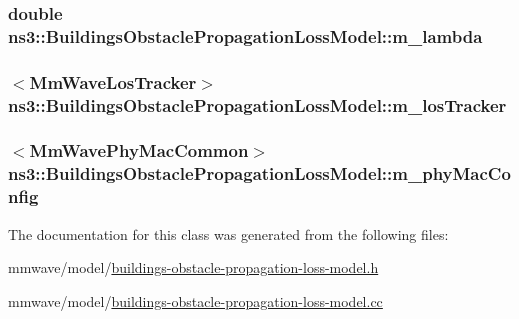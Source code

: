 \subsubsection[{\texorpdfstring{m\+\_\+lambda}{m_lambda}}]{\setlength{\rightskip}{0pt plus 5cm}double ns3\+::\+Buildings\+Obstacle\+Propagation\+Loss\+Model\+::m\+\_\+lambda\hspace{0.3cm}{\ttfamily [private]}}\hypertarget{classns3_1_1BuildingsObstaclePropagationLossModel_a9458e5626cd41b80c52ea62e3f3c8b2d}{}\label{classns3_1_1BuildingsObstaclePropagationLossModel_a9458e5626cd41b80c52ea62e3f3c8b2d}
\subsubsection[{\texorpdfstring{m\+\_\+los\+Tracker}{m_losTracker}}]{$<${\bf Mm\+Wave\+Los\+Tracker}$>$ ns3\+::\+Buildings\+Obstacle\+Propagation\+Loss\+Model\+::m\+\_\+los\+Tracker\hspace{0.3cm}{\ttfamily [private]}}\hypertarget{classns3_1_1BuildingsObstaclePropagationLossModel_a83f238f872f055847c5b938a3ac1ceaf}{}\label{classns3_1_1BuildingsObstaclePropagationLossModel_a83f238f872f055847c5b938a3ac1ceaf}
\subsubsection[{\texorpdfstring{m\+\_\+phy\+Mac\+Config}{m_phyMacConfig}}]{$<${\bf Mm\+Wave\+Phy\+Mac\+Common}$>$ ns3\+::\+Buildings\+Obstacle\+Propagation\+Loss\+Model\+::m\+\_\+phy\+Mac\+Config\hspace{0.3cm}{\ttfamily [private]}}\hypertarget{classns3_1_1BuildingsObstaclePropagationLossModel_a381a30a4251756853831782b3e58c721}{}\label{classns3_1_1BuildingsObstaclePropagationLossModel_a381a30a4251756853831782b3e58c721}


The documentation for this class was generated from the following files\+:\begin{DoxyCompactItemize}
\item 
mmwave/model/\hyperlink{buildings-obstacle-propagation-loss-model_8h}{buildings-\/obstacle-\/propagation-\/loss-\/model.\+h}\item 
mmwave/model/\hyperlink{buildings-obstacle-propagation-loss-model_8cc}{buildings-\/obstacle-\/propagation-\/loss-\/model.\+cc}\end{DoxyCompactItemize}
